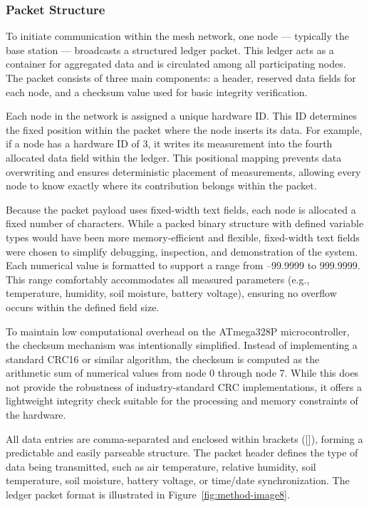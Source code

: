 \subsubsection{Packet Structure}

To initiate communication within the mesh network, one node ---
typically the base station --- broadcasts a structured ledger packet.
This ledger acts as a container for aggregated data and is circulated
among all participating nodes. The packet consists of three main
components: a header, reserved data fields for each node, and a checksum
value used for basic integrity verification.

Each node in the network is assigned a unique hardware ID. This ID
determines the fixed position within the packet where the node inserts
its data. For example, if a node has a hardware ID of 3, it writes its
measurement into the fourth allocated data field within the ledger. This
positional mapping prevents data overwriting and ensures deterministic
placement of measurements, allowing every node to know exactly where its
contribution belongs within the packet.

Because the packet payload uses fixed-width text fields, each node is allocated a fixed number of characters. While a packed binary structure with defined variable types would have been more memory-efficient and flexible, fixed-width text fields were chosen to simplify debugging, inspection, and demonstration of the system. Each numerical
value is formatted to support a range from --99.9999 to 999.9999. This
range comfortably accommodates all measured parameters (e.g.,
temperature, humidity, soil moisture, battery voltage), ensuring no
overflow occurs within the defined field size.

To maintain low computational overhead on the ATmega328P
microcontroller, the checksum mechanism was intentionally simplified.
Instead of implementing a standard CRC16 or similar algorithm, the
checksum is computed as the arithmetic sum of numerical values from node
0 through node 7. While this does not provide the robustness of
industry-standard CRC implementations, it offers a lightweight integrity
check suitable for the processing and memory constraints of the
hardware.

All data entries are comma-separated and enclosed within brackets
({[}{]}), forming a predictable and easily parseable structure. The
packet header defines the type of data being transmitted, such as air
temperature, relative humidity, soil temperature, soil moisture, battery
voltage, or time/date synchronization.
The ledger packet format is illustrated in Figure~\ref{fig:method-image8}.

